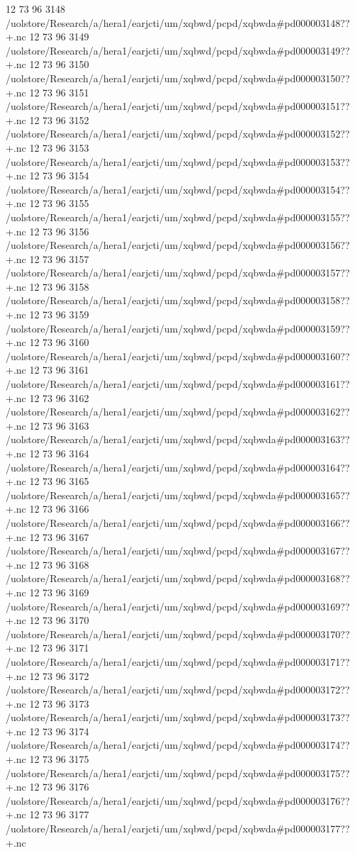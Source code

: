 12 73 96
3148
/uolstore/Research/a/hera1/earjcti/um/xqbwd/pcpd/xqbwda#pd000003148??+.nc
12 73 96
3149
/uolstore/Research/a/hera1/earjcti/um/xqbwd/pcpd/xqbwda#pd000003149??+.nc
12 73 96
3150
/uolstore/Research/a/hera1/earjcti/um/xqbwd/pcpd/xqbwda#pd000003150??+.nc
12 73 96
3151
/uolstore/Research/a/hera1/earjcti/um/xqbwd/pcpd/xqbwda#pd000003151??+.nc
12 73 96
3152
/uolstore/Research/a/hera1/earjcti/um/xqbwd/pcpd/xqbwda#pd000003152??+.nc
12 73 96
3153
/uolstore/Research/a/hera1/earjcti/um/xqbwd/pcpd/xqbwda#pd000003153??+.nc
12 73 96
3154
/uolstore/Research/a/hera1/earjcti/um/xqbwd/pcpd/xqbwda#pd000003154??+.nc
12 73 96
3155
/uolstore/Research/a/hera1/earjcti/um/xqbwd/pcpd/xqbwda#pd000003155??+.nc
12 73 96
3156
/uolstore/Research/a/hera1/earjcti/um/xqbwd/pcpd/xqbwda#pd000003156??+.nc
12 73 96
3157
/uolstore/Research/a/hera1/earjcti/um/xqbwd/pcpd/xqbwda#pd000003157??+.nc
12 73 96
3158
/uolstore/Research/a/hera1/earjcti/um/xqbwd/pcpd/xqbwda#pd000003158??+.nc
12 73 96
3159
/uolstore/Research/a/hera1/earjcti/um/xqbwd/pcpd/xqbwda#pd000003159??+.nc
12 73 96
3160
/uolstore/Research/a/hera1/earjcti/um/xqbwd/pcpd/xqbwda#pd000003160??+.nc
12 73 96
3161
/uolstore/Research/a/hera1/earjcti/um/xqbwd/pcpd/xqbwda#pd000003161??+.nc
12 73 96
3162
/uolstore/Research/a/hera1/earjcti/um/xqbwd/pcpd/xqbwda#pd000003162??+.nc
12 73 96
3163
/uolstore/Research/a/hera1/earjcti/um/xqbwd/pcpd/xqbwda#pd000003163??+.nc
12 73 96
3164
/uolstore/Research/a/hera1/earjcti/um/xqbwd/pcpd/xqbwda#pd000003164??+.nc
12 73 96
3165
/uolstore/Research/a/hera1/earjcti/um/xqbwd/pcpd/xqbwda#pd000003165??+.nc
12 73 96
3166
/uolstore/Research/a/hera1/earjcti/um/xqbwd/pcpd/xqbwda#pd000003166??+.nc
12 73 96
3167
/uolstore/Research/a/hera1/earjcti/um/xqbwd/pcpd/xqbwda#pd000003167??+.nc
12 73 96
3168
/uolstore/Research/a/hera1/earjcti/um/xqbwd/pcpd/xqbwda#pd000003168??+.nc
12 73 96
3169
/uolstore/Research/a/hera1/earjcti/um/xqbwd/pcpd/xqbwda#pd000003169??+.nc
12 73 96
3170
/uolstore/Research/a/hera1/earjcti/um/xqbwd/pcpd/xqbwda#pd000003170??+.nc
12 73 96
3171
/uolstore/Research/a/hera1/earjcti/um/xqbwd/pcpd/xqbwda#pd000003171??+.nc
12 73 96
3172
/uolstore/Research/a/hera1/earjcti/um/xqbwd/pcpd/xqbwda#pd000003172??+.nc
12 73 96
3173
/uolstore/Research/a/hera1/earjcti/um/xqbwd/pcpd/xqbwda#pd000003173??+.nc
12 73 96
3174
/uolstore/Research/a/hera1/earjcti/um/xqbwd/pcpd/xqbwda#pd000003174??+.nc
12 73 96
3175
/uolstore/Research/a/hera1/earjcti/um/xqbwd/pcpd/xqbwda#pd000003175??+.nc
12 73 96
3176
/uolstore/Research/a/hera1/earjcti/um/xqbwd/pcpd/xqbwda#pd000003176??+.nc
12 73 96
3177
/uolstore/Research/a/hera1/earjcti/um/xqbwd/pcpd/xqbwda#pd000003177??+.nc
